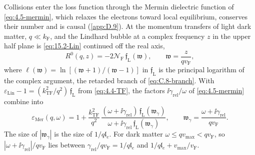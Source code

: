 Collisions enter the loss function through the Mermin dielectric function of \cref{eq:4.5-mermin}, which relaxes the electrons toward local equilibrium, conserves their number and is causal (\cref{app:D.9}). At the momentum transfers of light dark matter, $q \ll k_{\mathrm{F}}$, and the Lindhard bubble at a complex frequency $z$ in the upper half plane is \cref{eq:15.2-Lin} continued off the real axis,
\begin{equation}
  R^0(q,z) = -2\mathcal{N}_{\mathrm{F}}\,\mathfrak{f}_{\mathrm{L}}(\mathfrak{w}), \qquad \mathfrak{w} = \frac{z}{qv_{\mathrm{F}}} ,
  \label{eq:15.3-fL}
\end{equation}
where $\ell(\mathfrak{w}) = \ln[(\mathfrak{w} + 1)/(\mathfrak{w} - 1)]$ in $\mathfrak{f}_{\mathrm{L}}$ is the principal logarithm of the complex argument, the retarded branch of \cref{eq:C.8-branch}. With $\varepsilon_{\mathrm{Lin}} - 1 = (k_{\mathrm{TF}}^2/q^2)\,\mathfrak{f}_{\mathrm{L}}$ from \cref{eq:4.4-TF}, the factors $\ii\gamma_{\mathrm{rel}}/\omega$ of \cref{eq:4.5-mermin} combine into
\begin{equation}
  \varepsilon_{\mathrm{Mer}}(q,\omega) = 1 + \frac{k_{\mathrm{TF}}^2}{q^2}\,
  \frac{(\omega + \ii\gamma_{\mathrm{rel}})\,\mathfrak{f}_{\mathrm{L}}(\mathfrak{w}_\gamma)}{\omega + \ii\gamma_{\mathrm{rel}}\,\mathfrak{f}_{\mathrm{L}}(\mathfrak{w}_\gamma)}, \qquad
  \mathfrak{w}_\gamma = \frac{\omega + \ii\gamma_{\mathrm{rel}}}{qv_{\mathrm{F}}} .
  \label{eq:15.3-mermin}
\end{equation}
The size of $|\mathfrak{w}_\gamma|$ is the size of $1/q\mathfrak{l}_e$. For dark matter $\omega \le qv_{\mathrm{max}} < qv_{\mathrm{F}}$, so $|\omega + \ii\gamma_{\mathrm{rel}}|/qv_{\mathrm{F}}$ lies between $\gamma_{\mathrm{rel}}/qv_{\mathrm{F}} = 1/q\mathfrak{l}_e$ and $1/q\mathfrak{l}_e + v_{\mathrm{max}}/v_{\mathrm{F}}$.

